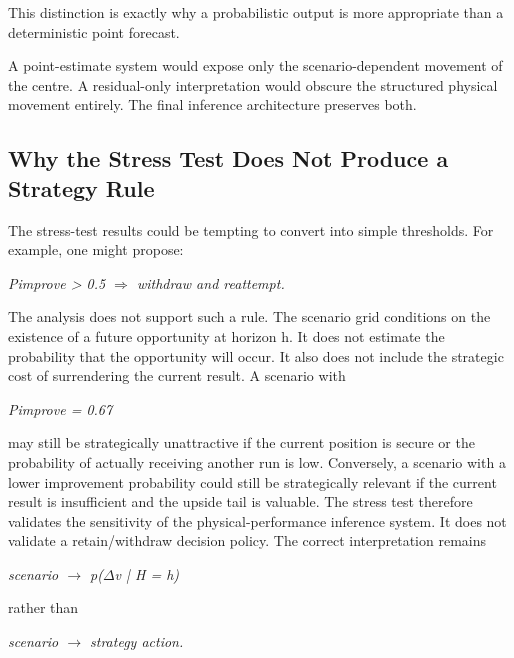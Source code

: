 This distinction is exactly why a probabilistic output is more appropriate than a deterministic point forecast.

A point-estimate system would expose only the scenario-dependent movement of the centre. A residual-only interpretation would obscure the structured physical movement entirely. The final inference architecture preserves both.

\subsection{Why the Stress Test Does Not Produce a Strategy Rule}
The stress-test results could be tempting to convert into simple thresholds. For example, one might propose:

\begin{center}\textit{Pimprove > 0.5 \ensuremath{\Rightarrow} withdraw and reattempt.}\end{center}

The analysis does not support such a rule. The scenario grid conditions on the existence of a future opportunity at horizon h. It does not estimate the probability that the opportunity will occur. It also does not include the strategic cost of surrendering the current result. A scenario with

\begin{center}\textit{Pimprove = 0.67}\end{center}

may still be strategically unattractive if the current position is secure or the probability of actually receiving another run is low. Conversely, a scenario with a lower improvement probability could still be strategically relevant if the current result is insufficient and the upside tail is valuable. The stress test therefore validates the sensitivity of the physical-performance inference system. It does not validate a retain/withdraw decision policy. The correct interpretation remains

\begin{center}\textit{scenario \ensuremath{\rightarrow} p(\ensuremath{\Delta}v | H = h)}\end{center}

rather than

\begin{center}\textit{scenario \ensuremath{\rightarrow} strategy action.}\end{center}

